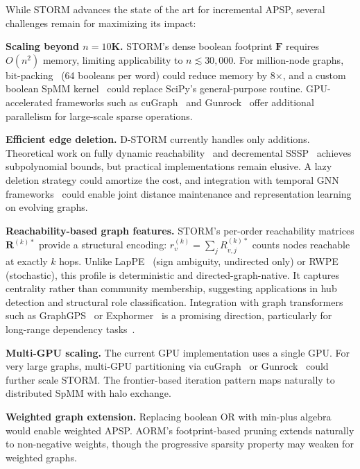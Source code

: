 \documentclass[journal]{IEEEtran}
\begin{document}
While STORM advances the state of the art for incremental APSP, several challenges remain for maximizing its impact:

\textbf{Scaling beyond $n = 10$K.} STORM's dense boolean footprint $\mathbf{F}$ requires $O(n^2)$ memory, limiting applicability to $n \lesssim 30{,}000$. For million-node graphs, bit-packing~\cite{bitpack2023} (64 booleans per word) could reduce memory by 8$\times$, and a custom boolean SpMM kernel~\cite{nagasaka2022bool} could replace SciPy's general-purpose routine. GPU-accelerated frameworks such as cuGraph~\cite{cugraph} and Gunrock~\cite{gunrock2} offer additional parallelism for large-scale sparse operations.

\textbf{Efficient edge deletion.} D-STORM currently handles only additions. Theoretical work on fully dynamic reachability~\cite{vdbrand2022reach} and decremental SSSP~\cite{bernstein2023} achieves subpolynomial bounds, but practical implementations remain elusive. A lazy deletion strategy could amortize the cost, and integration with temporal GNN frameworks~\cite{dygformer2023,tgb2024} could enable joint distance maintenance and representation learning on evolving graphs.

\textbf{Reachability-based graph features.} STORM's per-order reachability matrices $\mathbf{R}^{(k)*}$ provide a structural encoding: $r_v^{(k)} = \sum_j R^{(k)*}_{v,j}$ counts nodes reachable at exactly $k$ hops. Unlike LapPE~\cite{dwivedi2021lappe} (sign ambiguity, undirected only) or RWPE~\cite{dwivedi2022rwpe} (stochastic), this profile is deterministic and directed-graph-native. It captures centrality rather than community membership, suggesting applications in hub detection and structural role classification. Integration with graph transformers such as GraphGPS~\cite{graphgps} or Exphormer~\cite{exphormer2023} is a promising direction, particularly for long-range dependency tasks~\cite{digiovanni2023}.

\textbf{Multi-GPU scaling.} The current GPU implementation uses a single GPU. For very large graphs, multi-GPU partitioning via cuGraph~\cite{cugraph} or Gunrock~\cite{gunrock2} could further scale STORM. The frontier-based iteration pattern maps naturally to distributed SpMM with halo exchange.

\textbf{Weighted graph extension.} Replacing boolean OR with min-plus algebra would enable weighted APSP. AORM's footprint-based pruning extends naturally to non-negative weights, though the progressive sparsity property may weaken for weighted graphs.
\end{document}

